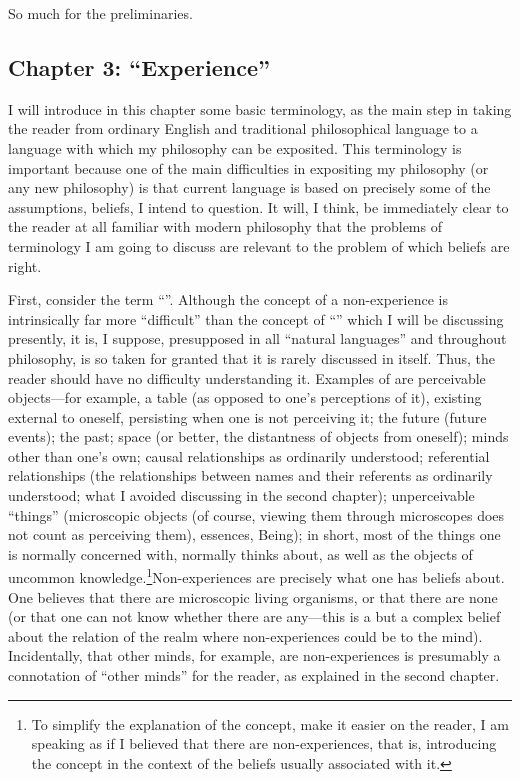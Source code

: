 So much for the preliminaries. 

\subsection[Chapter 3: \enquote{Experience}][\enquote{Experience}]{Chapter 3: \enquote{Experience}}

I will introduce in this chapter some basic terminology, as the main step in taking the reader from ordinary English and traditional philosophical language to a language with which my philosophy can be exposited. This terminology is important because one of the main difficulties in expositing my philosophy (or any new philosophy) is that current language is based on precisely some of the assumptions, beliefs, I intend to question. It will, I think, be immediately clear to the reader at all familiar with modern philosophy that the problems of terminology I am going to discuss are relevant to the problem of which beliefs are right. 

First, consider the term \enquote{}. Although the concept of a non-experience is intrinsically far more \enquote{difficult} than the concept of \enquote{} which I will be discussing presently, it is, I suppose, presupposed in all \enquote{natural languages} and throughout philosophy, is so taken for granted that it is rarely discussed in itself. Thus, the reader should have no difficulty understanding it. Examples of  are perceivable objects---for example, a table (as opposed to one's perceptions of it), existing external to oneself, persisting when one is not perceiving it; the future (future events); the past; space (or better, the distantness of objects from oneself); minds other than one's own; causal relationships as ordinarily understood; referential relationships (the relationships between names and their referents as ordinarily understood; what I avoided discussing in the second chapter); unperceivable \enquote{things} (microscopic objects (of course, viewing them through microscopes does not count as perceiving them), essences, Being); in short, most of the things one is normally concerned with, normally thinks about, as well as the objects of uncommon knowledge.\footnote{To simplify the explanation of the concept, make it easier on the reader, I am speaking as if I believed that there are non-experiences, that is, introducing the concept in the context of the beliefs usually associated with it.}Non-experiences are precisely what one has beliefs about. One believes that there are microscopic living organisms, or that there are none (or that one can not know whether there are any---this is  a  but a complex belief about the relation of the realm where non-experiences could be to the mind). Incidentally, that other minds, for example, are non-experiences is presumably a connotation of \enquote{other minds} for the reader, as explained in the second chapter. 

